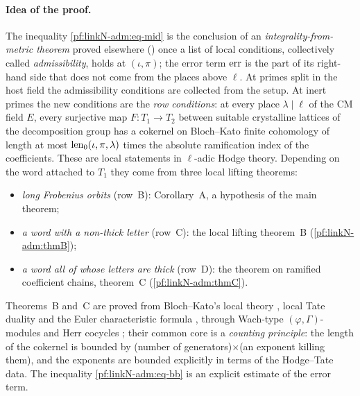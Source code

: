 \paragraph{Idea of the proof.}
The inequality \eqref{pf:linkN-adm:eq-mid} is the conclusion of an \emph{integrality-from-metric theorem}
proved elsewhere () once a list of local
conditions, collectively called \emph{admissibility}, holds at $(\iota,\pi)$; the error term $\operatorname{err}$ is
the part of its right-hand side that does not come from the places above $\ell$. At primes split in the host
field the admissibility conditions are collected from the setup. At inert primes the new conditions are the
\emph{row conditions}: at every place $\lambda\mid\ell$ of the CM field $E$, every surjective map $F\colon T_1\to T_2$
between suitable crystalline lattices of the decomposition group has a cokernel on Bloch--Kato finite cohomology
of length at most $\operatorname{len}_0(\iota,\pi,\lambda)$ times the absolute ramification index of the coefficients.
These are local statements in $\ell$-adic Hodge theory. Depending on the word attached to $T_1$ they come from
three local lifting theorems:
\begin{itemize}
\item \emph{long Frobenius orbits} (row~B): Corollary~A, a hypothesis of the main theorem;
\item \emph{a word with a non-thick letter} (row~C): the local lifting theorem~B (\cref{pf:linkN-adm:thmB});
\item \emph{a word all of whose letters are thick} (row~D): the theorem on ramified coefficient chains,
  theorem~C (\cref{pf:linkN-adm:thmC}).
\end{itemize}
Theorems~B and~C are proved from Bloch--Kato's local theory \cite{BlochKato1990}, local Tate duality and the
Euler characteristic formula \cite{Tate1963,Serre1997}, through Wach-type $(\varphi,\Gamma)$-modules
\cite{Wach1996,Berger2004} and Herr cocycles \cite{Herr1998}; their common core is a \emph{counting principle}:
the length of the cokernel is bounded by (number of generators)$\times$(an exponent killing them), and the
exponents are bounded explicitly in terms of the Hodge--Tate data. The inequality \eqref{pf:linkN-adm:eq-bb} is
an explicit estimate of the error term.

